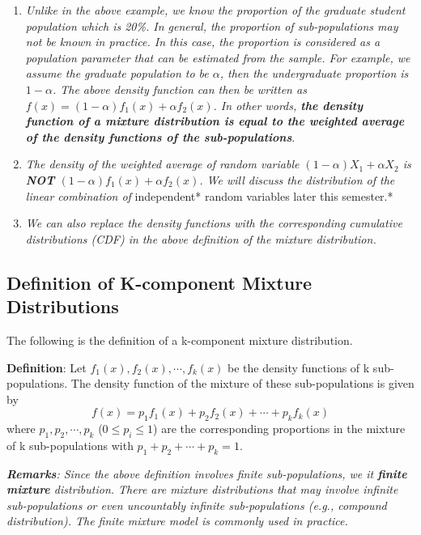 \documentclass[
]{book}
\begin{document}
\begin{enumerate}
\def\labelenumi{\arabic{enumi}.}
\item
  \emph{Unlike in the above example, we know the proportion of the graduate student population which is 20\%. In general, the proportion of sub-populations may not be known in practice. In this case, the proportion is considered as a population parameter that can be estimated from the sample. For example, we assume the graduate population to be \(\alpha\), then the undergraduate proportion is \(1-\alpha\). The above density function can then be written as \(f(x) = (1-\alpha)f_1(x) + \alpha f_2(x)\). In other words, \textbf{the density function of a mixture distribution is equal to the weighted average of the density functions of the sub-populations}}.
\item
  \emph{The density of the weighted average of random variable \((1-\alpha)X_1 + \alpha X_2\) is \textbf{NOT} \((1-\alpha)f_1(x) + \alpha f_2(x)\). We will discuss the distribution of the linear combination of }independent* random variables later this semester.*
\item
  \emph{We can also replace the density functions with the corresponding cumulative distributions (CDF) in the above definition of the mixture distribution.}
\end{enumerate}

\hypertarget{definition-of-k-component-mixture-distributions}{%
\subsection{Definition of K-component Mixture Distributions}\label{definition-of-k-component-mixture-distributions}}

The following is the definition of a k-component mixture distribution.

\textbf{Definition}: Let \(f_1(x), f_2(x), \cdots, f_k(x)\) be the density functions of k sub-populations. The density function of the mixture of these sub-populations is given by
\[
f(x) = p_1f_1(x) + p_2f_2(x) + \cdots + p_kf_k(x)
\]
where \(p_1, p_2, \cdots, p_k\) (\(0 \le p_i\le 1\)) are the corresponding proportions in the mixture of k sub-populations with \(p_1 +p_2 + \cdots + p_k = 1\).

\emph{\textbf{Remarks}: Since the above definition involves finite sub-populations, we it \textbf{finite mixture} distribution. There are mixture distributions that may involve infinite sub-populations or even uncountably infinite sub-populations (e.g., compound distribution). The finite mixture model is commonly used in practice.}
\end{document}
